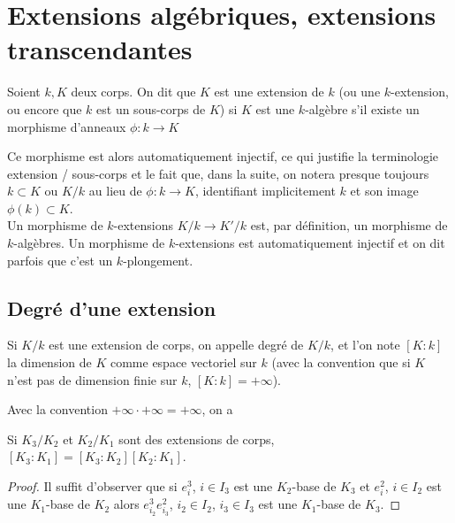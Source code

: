 \chapter{Extensions algébriques, extensions transcendantes}

\begin{definition}
  Soient $k,K$ deux corps. On dit que $K$ est une extension de $k$ (ou
  une $k$-extension, ou encore que $k$ est un sous-corps de $K$) si
  $K$ est une $k$-algèbre \ie{} s'il existe un morphisme d'anneaux
  $\phi:k\rightarrow K$
\end{definition}

\begin{remarque}
  Ce morphisme est alors automatiquement injectif, ce qui justifie la
  terminologie \og extension / sous-corps \fg{} et le fait que, dans
  la suite, on notera presque toujours $k\subset K$ ou $K/k$ au lieu
  de  $\phi:k\rightarrow K$, identifiant implicitement $k$ et son
  image $\phi(k)\subset K$.\\
  Un morphisme de $k$-extensions $K/k\rightarrow K'/k$ est, par
  définition, un morphisme de $k$-algèbres. Un morphisme de
  $k$-extensions est automatiquement injectif et on dit parfois que
  c'est un $k$-plongement.\\
\end{remarque}


\section{Degré d'une extension}\label{Dim}

\begin{definition}
  Si $K/k$ est une extension de corps, on appelle degré de $K/k$, et
  l'on note $[K:k]$ la dimension de $K$ comme espace vectoriel sur $k$
  (avec la convention que si $K$ n'est pas de dimension finie sur $k$,
  $[K:k]=+\infty$).
\end{definition}

Avec la convention $+\infty\cdot +\infty=+\infty$, on a \\

\begin{lemme}
  Si $K_3/K_2$ et $K_2/K_1$ sont des extensions de corps,
  $[K_3:K_1]=[K_3:K_2][K_2:K_1]$.
\end{lemme}

\begin{proof}
  Il suffit d'observer que si $e^3_i$, $i\in I_3$ est une $K_2$-base
  de $K_3$ et $e^2_i$, $i\in I_2$ est une $K_1$-base de $K_2$ alors
  $e_{i_2}^3e_{i_3}^2$, $i_2\in I_2$, $i_3\in I_3$ est une $K_1$-base
  de $K_3$.
\end{proof}


